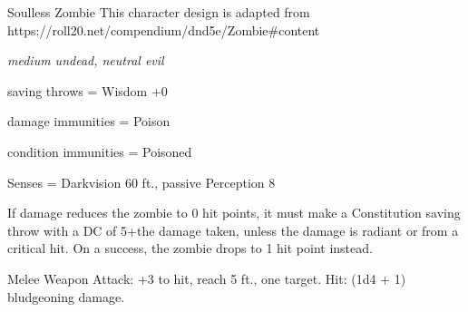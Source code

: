 \begin{monsterbox}{Soulless Zombie}
	This character design is adapted from https://roll20.net/compendium/dnd5e/Zombie\#content
	\begin{hangingpar}
		\textit{medium undead, neutral evil}
	\end{hangingpar}
	\dndline%
	\basics[%
	armorclass = 8,
	hitpoints  = 22,
	speed      = 20 ft
	]
	\dndline%
	\stats[
	STR = \stat{13}, %
	DEX = \stat{6},
	CON = \stat{16},
	INT = \stat{3},
	WIS = \stat{6},
	CHA = \stat{5}
	]
	\dndline%
	\details[%
	languages = {All, cannot speak},
	challenge = 1/4
	]
	\dndline%
	saving throws = Wisdom +0
	
	damage immunities = Poison
	
	condition immunities = Poisoned	
	
	Senses = Darkvision 60 ft., passive Perception 8
	\dndline%
	\begin{monsteraction}
		If damage reduces the zombie to 0 hit points, it must make a Constitution saving throw with a DC of 5+the damage taken, unless the damage is radiant or from a critical hit. On a success, the zombie drops to 1 hit point instead.
	\end{monsteraction}	
	\begin{monsteraction}[Slam]
		Melee Weapon Attack: +3 to hit, reach 5 ft., one target. Hit: (1d4 + 1) bludgeoning damage. 
	\end{monsteraction}		
\end{monsterbox}